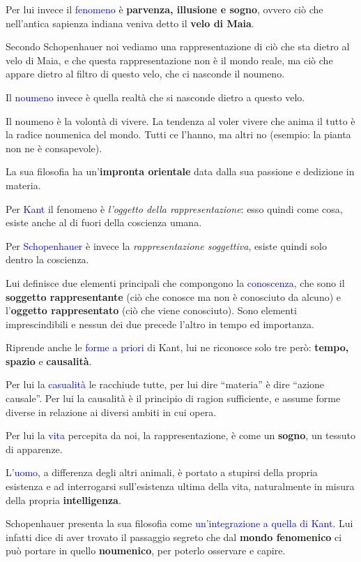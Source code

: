 \documentclass[a4paper, twoside, titlepage]{book}
\renewcommand{\emph}[1]{\textcolor{blue}{#1}}
\begin{document}
Per lui invece il \emph{fenomeno} è \textbf{parvenza, illusione e sogno}, ovvero ciò che nell’antica sapienza indiana veniva detto il \textbf{velo di Maia}.

Secondo Schopenhauer noi vediamo una rappresentazione di ciò che sta dietro al velo di Maia, e che questa rappresentazione non è il mondo reale, ma ciò che appare dietro al filtro di questo velo, che ci nasconde il noumeno.

Il \emph{noumeno} invece è quella realtà che si nasconde dietro a questo velo.

Il noumeno è la volontà di vivere. La tendenza al voler vivere che anima il tutto è la radice noumenica del mondo. Tutti ce l’hanno, ma altri no (esempio: la pianta non ne è consapevole).

La sua filosofia ha un’\textbf{impronta orientale} data dalla sua passione e dedizione in materia.

Per \emph{Kant} il fenomeno è \textit{l’oggetto della rappresentazione}: esso quindi come cosa, esiste anche al di fuori della coscienza umana.

Per \emph{Schopenhauer} è invece la \textit{rappresentazione soggettiva}, esiste quindi solo dentro la coscienza.

Lui definisce due elementi principali che compongono la \emph{conoscenza}, che sono il \textbf{soggetto rappresentante} (ciò che conosce ma non è conosciuto da alcuno) e l’\textbf{oggetto rappresentato} (ciò che viene conosciuto). Sono elementi imprescindibili e nessun dei due precede l’altro in tempo ed importanza.

Riprende anche le \emph{forme a priori} di Kant, lui ne riconosce solo tre però: \textbf{tempo, spazio} e \textbf{causalità}.

Per lui la \emph{casualità} le racchiude tutte, per lui dire “materia” è dire “azione causale”. Per lui la causalità è il principio di ragion sufficiente, e assume forme diverse in relazione ai diversi ambiti in cui opera.

Per lui la \emph{vita} percepita da noi, la rappresentazione, è come un \textbf{sogno}, un tessuto di apparenze.

L’\emph{uomo}, a differenza degli altri animali, è portato a stupirsi della propria esistenza e ad interrogarsi sull’esistenza ultima della vita, naturalmente in misura della propria \textbf{intelligenza}.

Schopenhauer presenta la sua filosofia come \emph{un’integrazione a quella di Kant}. Lui infatti dice di aver trovato il passaggio segreto che dal \textbf{mondo fenomenico} ci può portare in quello \textbf{noumenico}, per poterlo osservare e capire.
\end{document}
